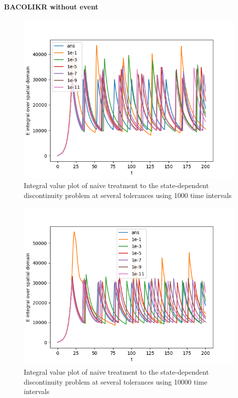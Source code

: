 \documentclass{article}
\begin{document}
\paragraph{BACOLIKR without event}
\begin{figure}[H]
\centering
\includegraphics[width=0.7\linewidth]{./figures/pde_state_disc_tol_bacolikr_naive_1000}
\caption{Integral value plot of naive treatment to the state-dependent discontinuity problem at several tolerances using 1000 time intervals}
\label{fig:pde_state_disc_tol_bacolikr_naive_1000}
\end{figure}

\begin{figure}[H]
\centering
\includegraphics[width=0.7\linewidth]{./figures/pde_state_disc_tol_bacolikr_naive_10000}
\caption{Integral value plot of naive treatment to the state-dependent discontinuity problem at several tolerances using 10000 time intervals}
\label{fig:pde_state_disc_tol_bacolikr_naive_10000}
\end{figure}
\end{document}
